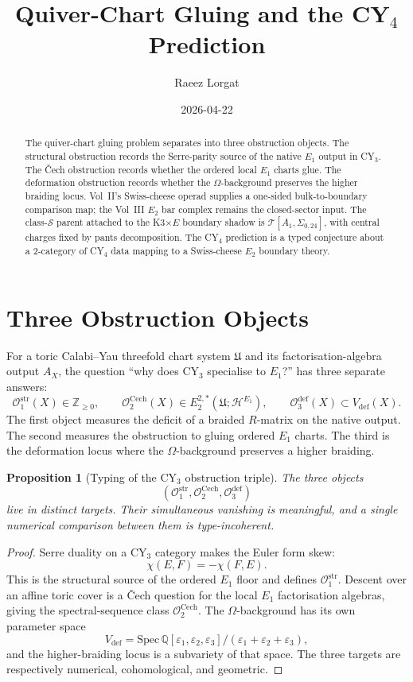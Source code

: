 \documentclass[11pt]{article}
\title{Quiver-Chart Gluing and the CY$_4$ Prediction}
\author{Raeez Lorgat}
\date{2026-04-22}
\newtheorem{proposition}[theorem]{Proposition}
\providecommand{\Eone}{E_1}
\providecommand{\Etwo}{E_2}
\providecommand{\Z}{\mathbb{Z}}
\providecommand{\Q}{\mathbb{Q}}
\providecommand{\cH}{\mathcal{H}}
\providecommand{\cT}{\mathcal{T}}
\begin{document}
\maketitle

\begin{abstract}
The quiver-chart gluing problem separates into three obstruction
objects. The structural obstruction records the Serre-parity source of
the native $\Eone$ output in CY$_3$. The \v{C}ech
obstruction records whether the ordered local $\Eone$ charts glue. The
deformation obstruction records whether the $\Omega$-background preserves
the higher braiding locus. Vol~II's Swiss-cheese operad supplies a
one-sided bulk-to-boundary comparison map; the Vol~III $\Etwo$ bar
complex remains the closed-sector input. The class-$\mathcal S$ parent
attached to the K3$\times E$ boundary shadow is
$\cT[A_1,\Sigma_{0,24}]$, with central charges fixed by pants
decomposition. The CY$_4$ prediction is a typed conjecture about a
2-category of CY$_4$ data mapping to a Swiss-cheese $\Etwo$ boundary
theory.
\end{abstract}

\section{Three Obstruction Objects}

For a toric Calabi--Yau threefold chart system $\mathfrak U$ and its
factorisation-algebra output $A_X$, the question ``why does CY$_3$
specialise to $\Eone$?'' has three separate answers:
\[
  \mathcal O_1^{\mathrm{str}}(X)\in\Z_{\ge0},\qquad
  \mathcal O_2^{\mathrm{Cech}}(X)\in
  E_2^{2,*}(\mathfrak U;\cH^{\Eone}),\qquad
  \mathcal O_3^{\mathrm{def}}(X)\subset V_{\mathrm{def}}(X).
\]
The first object measures the deficit of a braided $R$-matrix on the
native output. The second measures the obstruction to gluing ordered
$\Eone$ charts. The third is the deformation locus where the
$\Omega$-background preserves a higher braiding.

\begin{proposition}[Typing of the CY$_3$ obstruction triple]
\label{prop:three-obstruction-typing}
The three objects
\[
(\mathcal O_1^{\mathrm{str}},
 \mathcal O_2^{\mathrm{Cech}},
 \mathcal O_3^{\mathrm{def}})
\]
live in distinct targets. Their simultaneous vanishing is meaningful,
and a single numerical comparison between them is type-incoherent.
\end{proposition}

\begin{proof}
Serre duality on a CY$_3$ category makes the Euler form skew:
\[
  \chi(E,F)=-\chi(F,E).
\]
This is the structural source of the ordered $\Eone$ floor and defines
$\mathcal O_1^{\mathrm{str}}$. Descent over an affine toric cover is a
\v{C}ech question for the local $\Eone$ factorisation algebras, giving
the spectral-sequence class $\mathcal O_2^{\mathrm{Cech}}$. The
$\Omega$-background has its own parameter space
\[
  V_{\mathrm{def}}=\mathrm{Spec}\,
  \Q[\varepsilon_1,\varepsilon_2,\varepsilon_3]/
  (\varepsilon_1+\varepsilon_2+\varepsilon_3),
\]
and the higher-braiding locus is a subvariety of that space. The three
targets are respectively numerical, cohomological, and geometric.
\end{proof}
\end{document}
